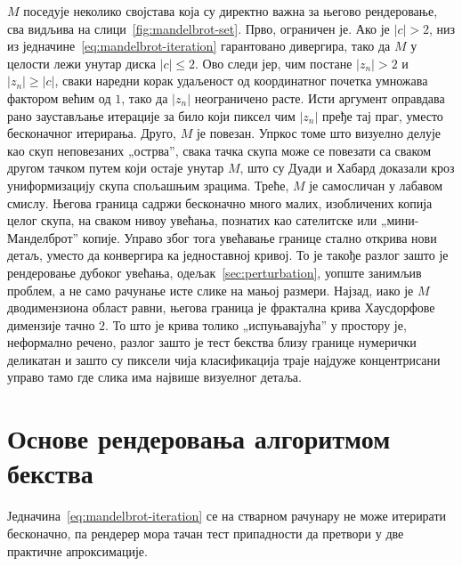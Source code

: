 \documentclass[serbian]{ftndiplomski}
\begin{document}
$M$ поседује неколико својстава која су директно важна за његово рендеровање, сва
видљива на слици~\ref{fig:mandelbrot-set}. Прво, ограничен је. Ако је $|c| > 2$, низ из
једначине~\ref{eq:mandelbrot-iteration} гарантовано дивергира, тако да $M$ у целости
лежи унутар диска $|c| \leq 2$. Ово следи јер, чим постане $|z_n| > 2$ и $|z_n| \geq
|c|$, сваки наредни корак удаљеност од координатног почетка умножава фактором већим од
$1$, тако да $|z_n|$ неограничено расте. Исти аргумент оправдава рано заустављање
итерације за било који пиксел чим $|z_n|$ пређе тај праг, уместо бесконачног
итерирања. Друго, $M$ је повезан. Упркос томе што визуелно делује као скуп неповезаних
„острва'', свака тачка скупа може се повезати са сваком другом тачком путем који остаје
унутар $M$, што су Дуади и Хабард доказали кроз униформизацију скупа спољашњим
зрацима. Треће, $M$ је самосличан у лабавом смислу. Његова граница садржи бесконачно
много малих, изобличених копија целог скупа, на сваком нивоу увећања, познатих као
сателитске или „мини-Манделброт'' копије. Управо због тога увећавање границе стално
открива нови детаљ, уместо да конвергира ка једноставној кривој. То је такође разлог
зашто је рендеровање дубоког увећања, одељак~\ref{sec:perturbation}, уопште занимљив
проблем, а не само рачунање исте слике на мањој размери. Најзад, иако је $M$
дводимензиона област равни, његова граница је фрактална крива Хаусдорфове димензије
тачно $2$. То што је крива толико „испуњавајућа'' у простору је, неформално речено,
разлог зашто је тест бекства близу границе нумерички деликатан и зашто су пиксели чија
класификација траје најдуже концентрисани управо тамо где слика има највише визуелног
детаља.

\section{Основе рендеровања алгоритмом бекства}
\label{sec:escape-time-basics}

Једначина~\ref{eq:mandelbrot-iteration} се на стварном рачунару не може итерирати
бесконачно, па рендерер мора тачан тест припадности да претвори у две практичне
апроксимације.
\end{document}
